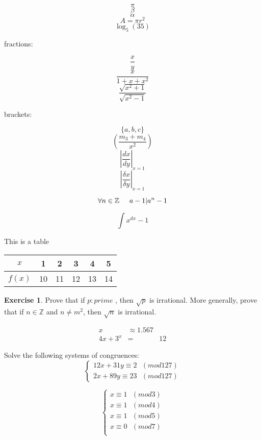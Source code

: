 \documentclass[12pt a]{article}
\theoremstyle{definition}
\newtheorem{ex}{Exercise}
\theoremstyle{definition}
\theoremstyle{definition}
\begin{document}
$$\pi $$
$$\beta $$ 
$$\alpha $$
$$ A = \pi r^2 $$
$$\log_5 (35)$${
	
fractions: 

$$ \frac{x}{y}$$
$$  \frac{x}{1+x+x^2} $$
$$\frac{\sqrt{x^2 + 1}}{\sqrt{x^2 -1 }} $$

brackets: 

$$ \{a,b,c\} $$
$$\left(\frac{m_3 + m _4}{x^2}\right) $$
$$\left| \frac{dx}{dy} \right|_{x=1}$$
$$\left| \frac{\delta x}{\delta y} \right|_{x=1}$$

$$ \forall n\in\mathbb{Z} \hspace{0.5cm} a-1| 	a^n-1 $$

$$\int x^{dx} - 1$$

This is a table \\

\begin{tabular}{|c|c|c|c|c|c|} %
\hline %

$x$ & 1 & 2 & 3 & 4 & 5 \\ \hline 
$f(x)$ & 10 & 11 & 12 & 13 & 14\\  \hline

	
\end{tabular}

\begin{ex}
	Prove that if $p:prime$ , then $\sqrt{p}$ is irrational. More generally, prove that if $n\in \mathbb{Z}$ and $ n\neq m^2$, then $\sqrt{n}$ is irrational. 
\end{ex}
	

\begin{eqnarray*} %
	x &\approx 1.567 \\  %
	4x+3^x &= &12
\end{eqnarray*}

Solve the following systems of congruences: 	
\begin{equation}
\begin{cases}
12x + 31y \equiv 2\text{ }(mod127)
\\
2x + 89y \equiv 23 \text{ }(mod127)
\end{cases}
\end{equation}	

\begin{equation}
\begin{cases}
x \equiv 1 \text{ }(mod3) \\ 
x \equiv 1 \text{ }(mod4) \\
x \equiv 1 \text{ }(mod5) \\ 
x \equiv 0 \text{ }(mod7) \\ 
\end{cases}
\end{equation}

}
\end{document}
